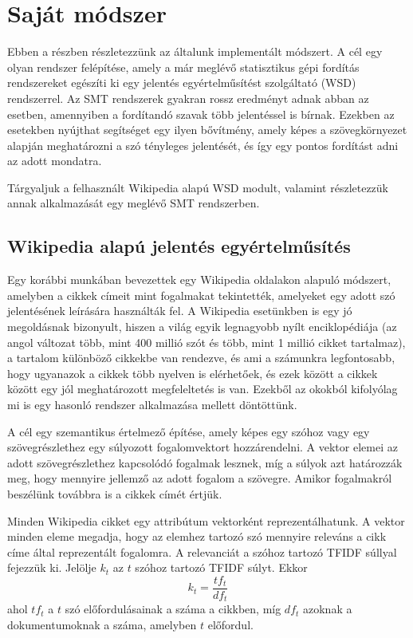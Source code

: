 \section{Saját módszer} \label{sec:new_method}

Ebben a részben részletezzünk az általunk implementált módszert. A cél egy olyan rendszer felépítése, amely a már meglévő statisztikus gépi fordítás rendszereket egészíti ki egy jelentés egyértelműsítést szolgáltató (WSD) rendszerrel. Az SMT rendszerek gyakran rossz eredményt adnak abban az esetben, amennyiben a fordítandó szavak több jelentéssel is bírnak. Ezekben az esetekben nyújthat segítséget egy ilyen bővítmény, amely képes a szövegkörnyezet alapján meghatározni a szó tényleges jelentését, és így egy pontos fordítást adni az adott mondatra. 

Tárgyaljuk a felhasznált Wikipedia alapú WSD modult, valamint részletezzük annak alkalmazását egy meglévő SMT rendszerben.

\subsection{Wikipedia alapú jelentés egyértelműsítés} \label{sec:WikiWSD}

Egy korábbi munkában \cite{gabrilovich2007computing} bevezettek egy Wikipedia oldalakon alapuló módszert, amelyben a cikkek címeit mint fogalmakat tekintették, amelyeket egy adott szó jelentésének leírására használták fel. A Wikipedia esetünkben is egy jó megoldásnak bizonyult, hiszen a világ egyik legnagyobb nyílt enciklopédiája (az angol változat több, mint 400 millió szót és több, mint 1 millió cikket tartalmaz), a tartalom különböző cikkekbe van rendezve, és ami a számunkra legfontosabb, hogy ugyanazok a cikkek több nyelven is elérhetőek, és ezek között a cikkek között egy jól meghatározott megfeleltetés is van. Ezekből az okokból kifolyólag mi is egy hasonló rendszer alkalmazása mellett döntöttünk.

A cél egy szemantikus értelmező építése, amely képes egy szóhoz vagy egy szövegrészlethez egy súlyozott fogalomvektort hozzárendelni. A vektor elemei az adott szövegrészlethez kapcsolódó fogalmak lesznek, míg a súlyok azt határozzák meg, hogy mennyire jellemző az adott fogalom a szövegre. Amikor fogalmakról beszélünk továbbra is a cikkek címét értjük. 

Minden Wikipedia cikket egy attribútum vektorként reprezentálhatunk. A vektor minden eleme megadja, hogy az elemhez tartozó szó mennyire releváns a cikk címe által reprezentált fogalomra. A relevanciát a szóhoz tartozó TFIDF súllyal fejezzük ki. Jelölje $k_t$ az $t$ szóhoz tartozó TFIDF súlyt. Ekkor 
\begin{equation}
	k_t = \frac{tf_t}{df_t}
\end{equation}
ahol $tf_t$ a $t$ szó előfordulásainak a száma a cikkben, míg $df_t$ azoknak a dokumentumoknak a száma, amelyben $t$ előfordul.

